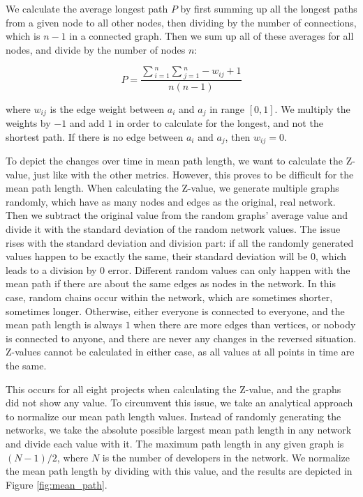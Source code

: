 We calculate the average longest path $P$ by first summing up all the longest paths from a given node to all other nodes, then dividing by the number of connections, which is $n-1$ in a connected graph. Then we sum up all of these averages for all nodes, and divide by the number of nodes $n$:

\[ P = \frac{\sum{_{i=1}^{n}} \sum{_{j=1}^{n} -w_{ij}+1} }{n(n-1)} \]

where $w_{ij}$ is the edge weight between $a_i$ and $a_j$ in range $[0, 1]$. We multiply the weights by $-1$ and add $1$ in order to calculate for the longest, and not the shortest path. If there is no edge between $a_i$ and $a_j$, then $w_{ij}=0$.

To depict the changes over time in mean path length, we want to calculate the Z-value, just like with the other metrics. However, this proves to be difficult for the mean path length. When calculating the Z-value, we generate multiple graphs randomly, which have as many nodes and edges as the original, real network. Then we subtract the original value from the random graphs' average value and divide it with the standard deviation of the random network values. The issue rises with the standard deviation and division part: if all the randomly generated values happen to be exactly the same, their standard deviation will be $0$, which leads to a division by $0$ error. Different random values can only happen with the mean path if there are about the same edges as nodes in the network. In this case, random chains occur within the network, which are sometimes shorter, sometimes longer. Otherwise, either everyone is connected to everyone, and the mean path length is always $1$ when there are more edges than vertices, or nobody is connected to anyone, and there are never any changes in the reversed situation. Z-values cannot be calculated in either case, as all values at all points in time are the same.

This occurs for all eight projects when calculating the Z-value, and the graphs did not show any value. To circumvent this issue, we take an analytical approach to normalize our mean path length values. Instead of randomly generating the networks, we take the absolute possible largest mean path length in any network and divide each value with it. The maximum path length in any given graph is $(N-1)/2$, where $N$ is the number of developers in the network. We normalize the mean path length by dividing with this value, and the results are depicted in Figure \ref{fig:mean_path}.

